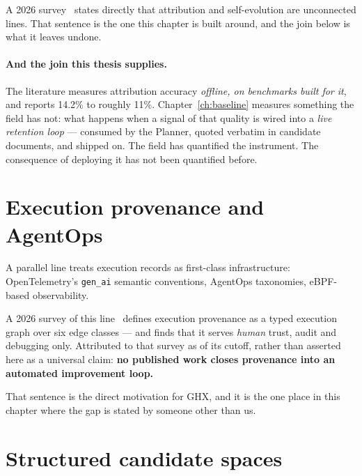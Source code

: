 A 2026 survey~\cite{survey-attr-evolve} states directly that attribution
and self-evolution are unconnected lines. That sentence is the one this
chapter is built around, and the join below is what it leaves undone.

\paragraph{And the join this thesis supplies.} The literature measures
attribution accuracy \emph{offline, on benchmarks built for it}, and
reports 14.2\% to roughly 11\%. Chapter~\ref{ch:baseline} measures
something the field has not: what happens when a signal of that quality is
wired into a \emph{live retention loop} --- consumed by the Planner, quoted
verbatim in candidate documents, and shipped on. The field has quantified
the instrument. The consequence of deploying it has not been quantified
before.

\section{Execution provenance and AgentOps}
\label{sec:provenance}

A parallel line treats execution records as first-class infrastructure:
OpenTelemetry's \texttt{gen\_ai} semantic conventions, AgentOps
taxonomies, eBPF-based observability.

A 2026 survey of this line~\cite{survey-provenance} defines execution
provenance as a typed execution graph over six edge classes --- and finds
that it serves \emph{human} trust, audit and debugging only. Attributed to
that survey as of its cutoff, rather than asserted here as a universal
claim: \textbf{no published work closes provenance into an automated
improvement loop.}

That sentence is the direct motivation for GHX, and it is the one place in
this chapter where the gap is stated by someone other than us.

\section{Structured candidate spaces}
\label{sec:structured-spaces}


